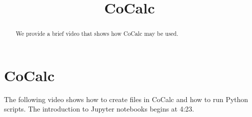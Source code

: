 \documentclass{ximera}
\title{CoCalc}
\begin{document}
  
\begin{abstract}  
We provide a brief video that shows how CoCalc may be used.
\end{abstract}  
\maketitle

\section{CoCalc}

The following video shows how to create files in CoCalc and how to run Python scripts. The introduction to Jupyter notebooks begins at 4:23.

\end{document}
